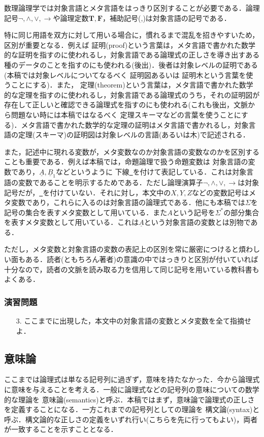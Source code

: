 \documentclass{ltjsarticle}
\theoremstyle{mystyle1}
\theoremstyle{mystyle2}
\newcommand{\uA}{\underline{A}}
\newcommand{\uB}{\underline{B}}
\newcommand{\bT}{\ensuremath{\mathbf{T}}}
\newcommand{\bF}{\ensuremath{\mathbf{F}}}
\newcommand{\red}[1]{{\color{red} #1}}
\begin{document}
数理論理学では対象言語とメタ言語をはっきり区別することが必要である．論理記号$\neg,\wedge,\vee,\to$や論理定数$\bT,\bF$，補助記号(,)は対象言語の記号である．

特に同じ用語を双方に対して用いる場合に，慣れるまで混乱を招きやすいため，区別が重要となる．例えば\red{証明}(proof)という言葉は，メタ言語で書かれた数学的な証明を指すのに使われるし，対象言語である論理式の正しさを導き出すある種のデータのことを指すのにも使われる(後出)．後者は対象レベルの証明である(本稿では対象レベルについてなるべく\red{証明図}あるいは\red{証明木}という言葉を使うことにする)．また，\red{定理}(theorem)という言葉は，メタ言語で書かれた数学的な定理を指すのに使われるし，対象言語である論理式のうち，それの証明図が存在して正しいと確認できる論理式を指すのにも使われる(これも後出，文脈から問題ない時には本稿ではなるべく\red{定理スキーマ}などの言葉を使うことにする)．メタ言語で書かれた数学的な定理の証明はメタ言語で書かれるし，対象言語の定理(スキーマ)の証明図は対象レベルの言語(あるいは木)で記述される．

また，記述中に現れる変数が，メタ変数なのか対象言語の変数なのかを区別することも重要である．例えば本稿では，命題論理で扱う命題変数は 対象言語の変数であり，$\uA,\uB_1$などというように 下線\underline{\ }を付けて表記している．これは対象言語の変数であることを明示するためである．ただし論理演算子$\neg,\wedge,\vee,\to$は対象記号だが，\underline{\ }を付けていない．それに対し，本文中の$X,Y,Z$などの変数記号はメタ変数であり，これらに入るのは対象言語の論理式である．他にも本稿では$\Sigma$を記号の集合を表すメタ変数として用いている．また$A$という記号を$\Sigma^\ast$の部分集合を表すメタ変数として用いている．これは$\uA$という対象言語の変数とは別物である．

ただし，メタ変数と対象言語の変数の表記上の区別を常に厳密につけると煩わしい面もある．読者(ともちろん著者)の意識の中ではっきりと区別が付いていれば十分なので，読者の文脈を読み取る力を信用して同じ記号を用いている教科書もよくある．
\subsubsection*{演習問題}
\begin{enumerate}
  \item[3.] ここまでに出現した，本文中の対象言語の変数とメタ変数を全て指摘せよ．
\end{enumerate}
\subsection{意味論}
ここまでは論理式は単なる記号列に過ぎず，意味を持たなかった．今から論理式に意味を与えることを考える．一般に論理式などの記号列の意味についての数学的な理論を\red{意味論}(semantics)と呼ぶ．本稿ではまず，意味論で論理式の正しさを定義することになる．一方これまでの記号列としての理論を\red{構文論}(syntax)と呼ぶ．構文論的な正しさの定義をいずれ行い(こちらを先に行ってもよい)，両者が一致することを示すこととなる．
\end{document}
